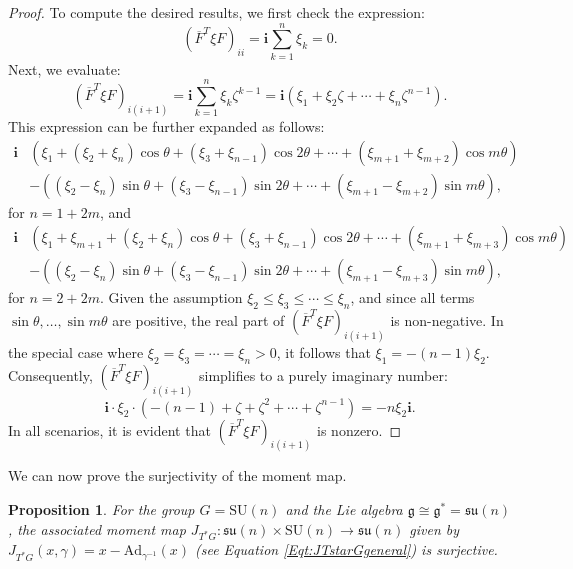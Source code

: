 \documentclass[12pt]{amsart}
\newtheorem{proposition}[theorem]{Proposition}
\theoremstyle{definition}
\numberwithin{equation}{section}
\newcommand{\imagunit}{\mathbf{i}}
\newcommand{\SU}{\mathrm{SU}}
\newcommand{\su}{\mathfrak{su}}
\newcommand{\gstar}{\mathfrak{g}^*}
\newcommand{\galgebra}{\mathfrak{g}}
\newcommand{\Adjointaction}{\mathrm{Ad}}
\begin{document}
{\begin{proof}
	
	To compute the desired results, we first check the expression: $$ (\overline{F}^T \xi F)_{ii} = \imagunit \sum_{k=1}^n \xi_k = 0. $$ Next, we evaluate: \[ (\overline{F}^T \xi F)_{i(i+1)} = \imagunit \sum_{k=1}^n \xi_k \zeta^{k-1} = \imagunit (\xi_1 + \xi_2 \zeta + \cdots + \xi_n \zeta^{n-1}). \] This expression can be further expanded as follows: \[ \begin{aligned} \imagunit &\left(\xi_1 + (\xi_2 + \xi_n)\cos \theta + (\xi_3 + \xi_{n-1})\cos 2\theta + \cdots + (\xi_{m+1} + \xi_{m+2})\cos m\theta\right) \\ &- \left((\xi_2 - \xi_n)\sin \theta + (\xi_3 - \xi_{n-1})\sin 2\theta + \cdots + (\xi_{m+1} - \xi_{m+2})\sin m\theta\right), \end{aligned} \] for $n = 1 + 2m$, and \[ \begin{aligned} \imagunit &\left(\xi_1 + \xi_{m+1} + (\xi_2 + \xi_n)\cos \theta + (\xi_3 + \xi_{n-1})\cos 2\theta + \cdots + (\xi_{m+1} + \xi_{m+3})\cos m\theta\right) \\ &- \left((\xi_2 - \xi_n)\sin \theta + (\xi_3 - \xi_{n-1})\sin 2\theta + \cdots + (\xi_{m+1} - \xi_{m+3})\sin m\theta\right), \end{aligned} \] for $n = 2 + 2m$. Given the assumption $\xi_2 \leqslant \xi_3 \leqslant \cdots \leqslant \xi_n$, and since all terms $\sin \theta, \ldots, \sin m\theta$ are positive, the real part of $(\overline{F}^T \xi F)_{i(i+1)}$ is non-negative. In the special case where $\xi_2 = \xi_3 = \cdots = \xi_n > 0$, it follows that $\xi_1 = -(n-1)\xi_2$. Consequently, $(\overline{F}^T \xi F)_{i(i+1)}$ simplifies to a purely imaginary number: $$ \imagunit \cdot \xi_2 \cdot (-(n-1) + \zeta + \zeta^2 + \cdots + \zeta^{n-1}) = -n\xi_2 \imagunit. $$ In all scenarios, it is evident that $(\overline{F}^T \xi F)_{i(i+1)}$ is nonzero.
	
	
	
\end{proof}

We can now prove the surjectivity of the moment map.


\begin{proposition}
	\label{Prop:SUnmomentmapsurjective}
	For the group $G=\SU(n)$ and the Lie algebra $\galgebra\cong \gstar=\su(n)$, the associated moment map $J_{T^*G}: \su(n)\times \SU(n)\to \su(n)$  given by 
	$J_{T^*G}(x, \gamma)=x- \Adjointaction_{\gamma^{-1}}(x) $ (see Equation \eqref{Eqt:JTstarGgeneral}) is surjective.
	
\end{proposition}


}
\end{document}
